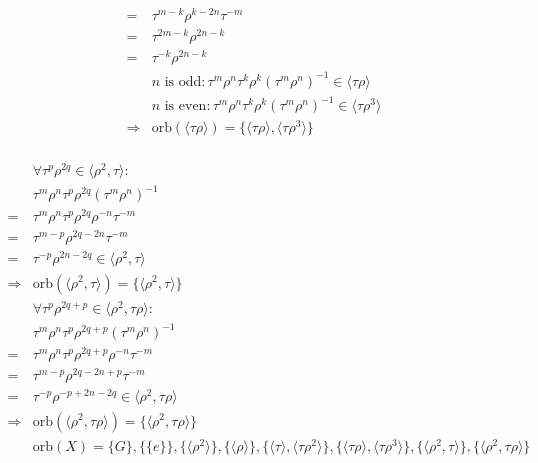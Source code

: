 \documentclass{article}
\begin{document}
\begin{equation*}
\begin{split}
        =&\tau^{m-k}\rho^{k-2n}\tau^{-m}\\
        =&\tau^{2m-k}\rho^{2n-k}\\
        =&\tau^{-k}\rho^{2n-k}\\
        &n\text{ is odd}:\tau^m\rho^n \tau^k\rho^k(\tau^m\rho^n)^{-1}\in\langle\tau\rho\rangle\\
        &n\text{ is even}:\tau^m\rho^n \tau^k\rho^k(\tau^m\rho^n)^{-1}\in\langle\tau\rho^3\rangle\\
        \Rightarrow&\text{orb}(\langle\tau\rho\rangle)=\{\langle\tau\rho\rangle,\langle\tau\rho^3\rangle\}\\
    \end{split}
\end{equation*}

\begin{equation*}
    \begin{split}
        &\forall \tau^p\rho^{2q}\in\langle\rho^2,\tau\rangle:\\
        &\tau^m\rho^n\tau^p\rho^{2q}(\tau^m\rho^n)^{-1}\\
        =&\tau^m\rho^n\tau^p\rho^{2q}\rho^{-n}\tau^{-m}\\
        =&\tau^{m-p}\rho^{2q-2n}\tau^{-m}\\
        =&\tau^{-p}\rho^{2n-2q}\in\langle\rho^2,\tau\rangle\\
        \Rightarrow&\text{orb}(\langle\rho^2,\tau\rangle)=\{\langle\rho^2,\tau\rangle\}\\
        &\forall\tau^p\rho^{2q+p}\in\langle\rho^2,\tau\rho\rangle:\\
        &\tau^m\rho^n\tau^p\rho^{2q+p}(\tau^m\rho^n)^{-1}\\
        =&\tau^m\rho^n\tau^p\rho^{2q+p}\rho^{-n}\tau^{-m}\\
        =&\tau^{m-p}\rho^{2q-2n+p}\tau^{-m}\\
        =&\tau^{-p}\rho^{-p+2n-2q}\in\langle\rho^2,\tau\rho\rangle\\
        \Rightarrow&\text{orb}(\langle\rho^2,\tau\rho\rangle)=\{\langle\rho^2,\tau\rho\rangle\}\\
        &\text{orb}(X)=\{G\},\{\{e\}\},\{\langle\rho^2\rangle\},\{\langle\rho\rangle\},\{\langle\tau\rangle,\langle\tau\rho^2\rangle\},\{\langle\tau\rho\rangle,\langle\tau\rho^3\rangle\},\{\langle\rho^2,\tau\rangle\},\{\langle\rho^2,\tau\rho\rangle\}\\
    \end{split}
\end{equation*}
\end{document}
